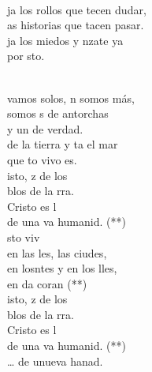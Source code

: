 \documentclass[12pt]{article}
\begin{document}
\begin{multicols*}{2}
\begin{cancion}
	\jump\\
	ja los rollos que tecen dudar,\\
	as historias que tacen pasar.\\
	ja los miedos y nzate ya  \\
	por sto. \\\jump\\
	\begin{chorus}%
	 vamos solos, n somos más,\\
	somos s de antorchas \\
	y un  de verdad.\\
	de la tierra y ta el mar\\
	que to vivo es. \\
	isto, z de los \\
	blos de la rra.\\
	Cristo es l \\
	de una va humanid. (**)\\
	sto viv\\
	en las les, las ciudes,\\
	en losntes y en los lles,\\
	en da coran (**) \\
	isto, z de los \\
	blos de la rra.\\
	Cristo es l \\
	de una va humanid. (**)\\
	… de unueva hanad.\\
	\end{chorus}%
	\jump\\
\end{cancion}%


\end{multicols*}
\end{document}

